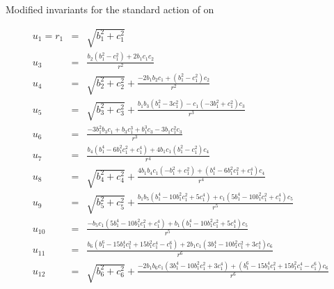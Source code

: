 \begin{table}
\caption[Modified invariants for $\SOn{2}, n=6$]
{Modified invariants for the standard action of  on }
\label{tab:SO2n6modif}
\begin{small}
\begin{eqnarray*}
  u_1=r_1 &=&\sqrt{b_1^2+c_1^2}\\
  u_3 &=&\frac{b_2 \left(b_1^2-c_1^2\right)+2 b_1 c_1 c_2}{r^2}\\
  u_4 &=&\sqrt{b_2^2+c_2^2}+\frac{-2
b_1 b_2 c_1+\left(b_1^2-c_1^2\right) c_2}{r^2}\\
  u_5 &=&\sqrt{b_3^2+c_3^2}+\frac{b_1 b_3 \left(b_1^2-3 c_1^2\right)-c_1 \left(-3
b_1^2+c_1^2\right) c_3}{r^3}\\
  u_6 &=&\frac{-3 b_1^2 b_3 c_1+b_3 c_1^3+b_1^3 c_3-3 b_1 c_1^2 c_3}{r^3}\\
  u_7 &=&\frac{b_4
\left(b_1^4-6 b_1^2 c_1^2+c_1^4\right)+4 b_1 c_1 \left(b_1^2-c_1^2\right) c_4}{r^4}\\
  u_8 &=&\sqrt{b_4^2+c_4^2}+\frac{4 b_1
b_4 c_1 \left(-b_1^2+c_1^2\right)+\left(b_1^4-6 b_1^2 c_1^2+c_1^4\right) c_4}{r^4}\\
  u_9 &=&\sqrt{b_5^2+c_5^2}+\frac{b_1
b_5 \left(b_1^4-10 b_1^2 c_1^2+5 c_1^4\right)+c_1 \left(5 b_1^4-10 b_1^2 c_1^2+c_1^4\right) c_5}{r^5}\\
  u_{10} &=&\frac{-b_5
c_1 \left(5 b_1^4-10 b_1^2 c_1^2+c_1^4\right)+b_1 \left(b_1^4-10 b_1^2 c_1^2+5 c_1^4\right) c_5}{r^5}\\
  u_{11} &=&\frac{b_6
\left(b_1^6-15 b_1^4 c_1^2+15 b_1^2 c_1^4-c_1^6\right)+2 b_1 c_1 \left(3 b_1^4-10 b_1^2 c_1^2+3 c_1^4\right) c_6}{r^6} \\
  u_{12} &=&\sqrt{b_6^2+c_6^2}+\frac{-2
b_1 b_6 c_1 \left(3 b_1^4-10 b_1^2 c_1^2+3 c_1^4\right)+\left(b_1^6-15 b_1^4 c_1^2+15 b_1^2 c_1^4-c_1^6\right) c_6}{r^6}
\end{eqnarray*}
\end{small}
\end{table}

